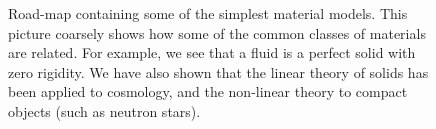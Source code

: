 \begin{figure}[!t]
\begin{centering}
\caption{Road-map containing some of the simplest material models. This picture coarsely shows how some of the common classes of materials are related. For example, we see that a fluid is a perfect solid with zero rigidity. We have also shown that the linear theory of solids has been applied to cosmology, and the non-linear theory to compact objects (such as neutron stars).}\label{fig:shem_roadmap}
\end{centering}
\end{figure}
 